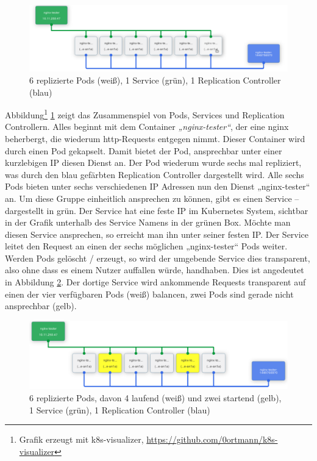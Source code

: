 \begin{figure}[h]
    \centering
    \includegraphics[scale=0.3]{img/pods-created-k8s.pdf}
    \caption{6 replizierte Pods (weiß), 1 Service (grün), 1 Replication Controller (blau)}
    \label{fig:k8s-pod-concept}
\end{figure}

Abbildung\footnote{Grafik erzeugt mit k8s-visualizer, \url{https://github.com/0ortmann/k8s-visualizer}} \ref{fig:k8s-pod-concept} zeigt das Zusammenspiel von Pods, Services und Replication Controllern. Alles beginnt mit dem Container \textit{„nginx-tester“}, der eine nginx beherbergt, die wiederum http-Requests entgegen nimmt. Dieser Container wird durch einen Pod gekapselt. Damit bietet der Pod, ansprechbar unter einer kurzlebigen IP diesen Dienst an. Der Pod wiederum wurde sechs mal repliziert, was durch den blau gefärbten Replication Controller dargestellt wird. Alle sechs Pods bieten unter sechs verschiedenen IP Adressen nun den Dienst „nginx-tester“ an. Um diese Gruppe einheitlich ansprechen zu können, gibt es einen Service -- dargestellt in grün. Der Service hat eine feste IP im Kubernetes System, sichtbar in der Grafik unterhalb des Service Namens in der grünen Box. Möchte man diesen Service ansprechen, so erreicht man ihn unter seiner festen IP. Der Service leitet den Request an einen der sechs möglichen „nginx-tester“ Pods weiter. Werden Pods gelöscht / erzeugt, so wird der umgebende Service dies transparent, also ohne dass es einem Nutzer auffallen würde, handhaben. Dies ist angedeutet in Abbildung \ref{fig:k8s-pod-starting}. Der dortige Service wird ankommende Requests transparent auf einen der vier verfügbaren Pods (weiß) balancen, zwei Pods sind gerade nicht ansprechbar (gelb).

\begin{figure}[h]
    \centering
    \includegraphics[scale=0.3]{img/pods-getting-ready-k8s.pdf}
    \caption{6 replizierte Pods, davon 4 laufend (weiß) und zwei startend (gelb), 1 Service (grün), 1 Replication Controller (blau)}
    \label{fig:k8s-pod-starting}
\end{figure}


